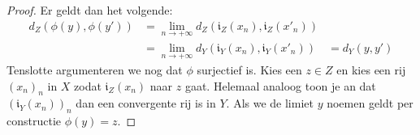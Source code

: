 \documentclass[main.tex]{subfiles}
\begin{document}
\begin{bst}
\begin{proof}
    Er geldt dan het volgende:
    \begin{align*}
      d_{Z}(\phi(y),\phi(y'))
      &= \lim_{n\rightarrow +\infty}d_{Z}(\mathfrak{i}_{Z}(x_{n}),\mathfrak{i}_{Z}(x'_{n}))\\
      &= \lim_{n\rightarrow +\infty}d_{Y}(\mathfrak{i}_{Y}(x_{n}),\mathfrak{i}_{Y}(x'_{n}))
      &= d_{Y}(y,y')
    \end{align*}
    Tenslotte argumenteren we nog dat $\phi$ surjectief is.
    Kies een $z\in Z$ en kies een rij $(x_{n})_{n}$ in $X$ zodat $\mathfrak{i}_{Z}(x_{n})$ naar $z$ gaat.
    Helemaal analoog toon je an dat $(\mathfrak{i}_{Y}(x_{n}))_{n}$ dan een convergente rij is in $Y$.
    Als we de limiet $y$ noemen geldt per constructie $\phi(y) = z$.
  \end{proof}
\end{bst}
\end{document}
